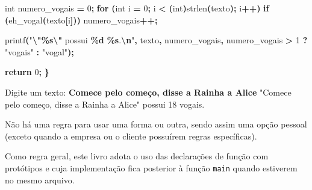 \documentclass[
  11pt,
  a4paper,
]{scrbook}
\newenvironment{Shaded}{\begin{snugshade}}{\end{snugshade}}
\newcommand{\ControlFlowTok}[1]{\textcolor[rgb]{0.13,0.29,0.53}{\textbf{#1}}}
\newcommand{\DataTypeTok}[1]{\textcolor[rgb]{0.13,0.29,0.53}{#1}}
\newcommand{\DecValTok}[1]{\textcolor[rgb]{0.00,0.00,0.81}{#1}}
\newcommand{\KeywordTok}[1]{\textcolor[rgb]{0.13,0.29,0.53}{\textbf{#1}}}
\newcommand{\NormalTok}[1]{#1}
\newcommand{\OperatorTok}[1]{\textcolor[rgb]{0.81,0.36,0.00}{\textbf{#1}}}
\newcommand{\SpecialCharTok}[1]{\textcolor[rgb]{0.81,0.36,0.00}{\textbf{#1}}}
\newcommand{\StringTok}[1]{\textcolor[rgb]{0.31,0.60,0.02}{#1}}
\begin{document}
\begin{Shaded}
\begin{Highlighting}[]
    \DataTypeTok{int}\NormalTok{ numero\_vogais }\OperatorTok{=} \DecValTok{0}\OperatorTok{;}
    \ControlFlowTok{for} \OperatorTok{(}\DataTypeTok{int}\NormalTok{ i }\OperatorTok{=} \DecValTok{0}\OperatorTok{;}\NormalTok{ i }\OperatorTok{\textless{}} \OperatorTok{(}\DataTypeTok{int}\OperatorTok{)}\NormalTok{strlen}\OperatorTok{(}\NormalTok{texto}\OperatorTok{);}\NormalTok{ i}\OperatorTok{++)}
        \ControlFlowTok{if} \OperatorTok{(}\NormalTok{eh\_vogal}\OperatorTok{(}\NormalTok{texto}\OperatorTok{[}\NormalTok{i}\OperatorTok{]))}
\NormalTok{            numero\_vogais}\OperatorTok{++;}

\NormalTok{    printf}\OperatorTok{(}\StringTok{"}\SpecialCharTok{\textbackslash{}"\%s\textbackslash{}"}\StringTok{ possui }\SpecialCharTok{\%d}\StringTok{ }\SpecialCharTok{\%s}\StringTok{.}\SpecialCharTok{\textbackslash{}n}\StringTok{"}\OperatorTok{,}\NormalTok{ texto}\OperatorTok{,}\NormalTok{ numero\_vogais}\OperatorTok{,}
\NormalTok{           numero\_vogais }\OperatorTok{\textgreater{}} \DecValTok{1} \OperatorTok{?} \StringTok{"vogais"} \OperatorTok{:} \StringTok{"vogal"}\OperatorTok{);}

    \ControlFlowTok{return} \DecValTok{0}\OperatorTok{;}
\OperatorTok{\}}
\end{Highlighting}
\end{Shaded}

\begin{Shaded}
\begin{Highlighting}[]
\NormalTok{Digite um texto: }\KeywordTok{ Comece pelo começo, disse a Rainha a Alice }
\NormalTok{"Comece pelo começo, disse a Rainha a Alice" possui 18 vogais.}
\end{Highlighting}
\end{Shaded}

Não há uma regra para usar uma forma ou outra, sendo assim uma opção
pessoal (exceto quando a empresa ou o cliente possuírem regras
específicas).

Como regra geral, este livro adota o uso das declarações de função com
protótipos e cuja implementação fica posterior à função \texttt{main}
quando estiverem no mesmo arquivo.
\end{document}
